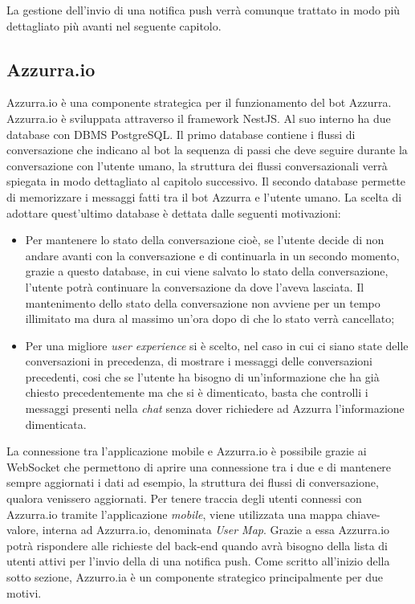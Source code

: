 \begin{trivlist}
	La gestione dell'invio di una \gls{notifica push}\ap{[g]} verrà comunque trattato in modo più dettagliato più avanti nel seguente capitolo.
	\item \subsection{Azzurra.io}
	Azzurra.io è una componente strategica per il funzionamento del \gls{bot}\ap{[g]} Azzurra. Azzurra.io è sviluppata attraverso il \gls{framework}\ap{[g]} NestJS. Al suo interno ha due database con \gls{DBMS}\ap{[g]} PostgreSQL. Il primo database contiene i flussi di conversazione che indicano al \gls{bot}\ap{[g]} la sequenza di passi che deve seguire durante la conversazione con l'utente umano, la struttura dei flussi conversazionali verrà spiegata in modo dettagliato al capitolo successivo. Il secondo database permette di memorizzare i messaggi fatti tra il \gls{bot}\ap{[g]} Azzurra e l'utente umano. La scelta di adottare quest'ultimo database è dettata dalle seguenti motivazioni:
	\begin{itemize}
		\item Per mantenere lo stato della conversazione cioè, se l'utente decide di non andare avanti con la conversazione e di continuarla in un secondo momento, grazie a questo database, in cui viene salvato lo stato della conversazione, l'utente potrà continuare la conversazione da dove l'aveva lasciata. Il mantenimento dello stato della conversazione non avviene per un tempo illimitato ma dura al massimo un'ora dopo di che lo stato verrà cancellato;
		\item Per una migliore \emph{user experience} si è scelto, nel caso in cui ci siano state delle conversazioni in precedenza, di mostrare i messaggi delle conversazioni precedenti, cosi che se l'utente ha bisogno di un’informazione che ha già chiesto precedentemente ma che si è dimenticato, basta che controlli i messaggi presenti nella \emph{chat} senza dover richiedere ad Azzurra l'informazione dimenticata.
	\end{itemize}
	La connessione tra l'applicazione mobile e Azzurra.io è possibile grazie ai \gls{WebSocket}\ap{[g]} che permettono di aprire una connessione tra i due e di mantenere sempre aggiornati i dati ad esempio, la struttura dei flussi di conversazione, qualora venissero aggiornati. Per tenere traccia degli utenti connessi con Azzurra.io tramite l'applicazione \emph{mobile}, viene utilizzata una mappa chiave-valore, interna ad Azzurra.io, denominata \emph{User Map}. Grazie a essa Azzurra.io potrà rispondere alle richieste del back-end quando avrà bisogno della lista di utenti attivi per l'invio della di una \gls{notifica push}\ap{[g]}. Come scritto all'inizio della sotto sezione, Azzurro.ia è un componente strategico principalmente per due motivi.

\end{trivlist}
